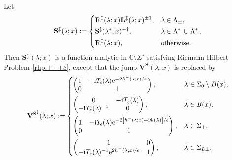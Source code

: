 \documentclass[12pt]{amsart}
\numberwithin{equation}{section}
\newcommand{\ee}{\mathrm{e}}
\newcommand{\ii}{\mathrm{i}}
\newcommand{\SP}{\lambda}
\newcommand{\phaseint}{\Phi}
\newcommand{\C}{\mathbb{C}}
\newcommand{\eps}{\epsilon}
\begin{document}
Let
\begin{equation}
	\mathbf{S}^\updownarrow(\SP;x) := \begin{dcases}
		\mathbf{R}^\updownarrow(\SP;x)  \mathbf{L}^\updownarrow(\SP;x)^{\pm 1}, & \SP \in \Lambda_\pm, \\
		\mathbf{S}^\updownarrow(\SP^*;x)^{-\dagger},  & \SP \in \Lambda_+^* \cup \Lambda_-^*, \\
		\mathbf{R}^\updownarrow(\SP;x), & \text{otherwise.}
	\end{dcases}
\end{equation}
Then $\mathbf{S}^\updownarrow(\SP;x)$ is a function analytic in $\C \setminus \Sigma'$ satisfying Riemann-Hilbert Problem~\ref{rhp:+++S}, except that the jump $\mathbf{V^S}(\SP;x)$ is replaced by 
\begin{equation}
	\mathbf{V}^{\mathbf{S}^\updownarrow}(\SP;x) := \begin{dcases}
		\begin{pmatrix} 1 & -\ii T_\epsilon(\SP) \ee^{-2h^-(\SP;x)/\epsilon} \\ 0 & 1 \end{pmatrix}, & \SP \in \Sigma_0 \setminus B(x), \\
		\begin{pmatrix} 0 & -\ii T_\eps(\SP) \\ -\ii T_\eps(\SP)^{-1} & 0 \end{pmatrix}, & \SP \in  B(x), \\
		\begin{pmatrix} 1 & -\ii Y_\eps(\SP) \ee^{-2\left[h^-(\SP;x) \mp \ii \phaseint(\SP) \right]/\eps} \\ 0 & 1 \end{pmatrix}, & \SP \in \Sigma_\pm, \\
		\begin{pmatrix} 1 & 0 \\ -\ii T_\eps(\SP)^{-1} \ee^{2h^-(\SP;x)/\eps } & 1 \end{pmatrix}, & \SP \in \Sigma_{L\pm}. \\
	\end{dcases}
\label{eq:jump+++S.J-}
\end{equation}
\end{document}
